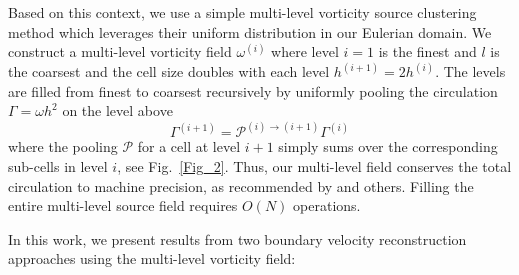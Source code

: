 \documentclass[11pt]{article}
\begin{document}
Based on this context, we use a simple multi-level vorticity source clustering method which leverages their uniform distribution in our Eulerian domain. We construct a multi-level vorticity field $\omega^{(i)}$ where level $i=1$ is the finest and $l$ is the coarsest and the cell size doubles with each level $h^{(i+1)}=2h^{(i)}$. The levels are filled from finest to coarsest recursively by uniformly pooling the circulation $\Gamma=\omega h^2$ on the level above 
\begin{equation}
\Gamma^{(i+1)}=\mathcal{P}^{(i)\to(i+1)}\Gamma^{(i)}
\end{equation}
where the pooling $\mathcal{P}$ for a cell at level $i+1$ simply sums over the corresponding sub-cells in level $i$, see Fig.~\ref{Fig_2}. Thus, our multi-level field conserves the total circulation to machine precision, as recommended by \cite{Colonius2008} and others. Filling the entire multi-level source field requires $O(N)$ operations.

In this work, we present results from two boundary velocity reconstruction approaches using the multi-level vorticity field:
\end{document}
